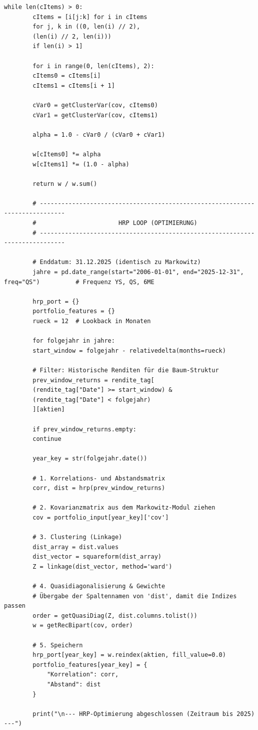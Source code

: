 \documentclass[parskip=half]{scrartcl}
\begin{document}
\begin{lstlisting}[caption={HRP-Algorithmus}, label={lst:hrp_code}]
		while len(cItems) > 0: 
		cItems = [i[j:k] for i in cItems  
		for j, k in ((0, len(i) // 2),  
		(len(i) // 2, len(i)))  
		if len(i) > 1] 
		
		for i in range(0, len(cItems), 2): 
		cItems0 = cItems[i] 
		cItems1 = cItems[i + 1] 
		
		cVar0 = getClusterVar(cov, cItems0) 
		cVar1 = getClusterVar(cov, cItems1) 
		
		alpha = 1.0 - cVar0 / (cVar0 + cVar1) 
		
		w[cItems0] *= alpha 
		w[cItems1] *= (1.0 - alpha) 
		
		return w / w.sum() 
		
		# ----------------------------------------------------------------------------- 
		#                       HRP LOOP (OPTIMIERUNG)
		# ----------------------------------------------------------------------------- 
		
		# Enddatum: 31.12.2025 (identisch zu Markowitz)
		jahre = pd.date_range(start="2006-01-01", end="2025-12-31", freq="QS")          # Frequenz YS, QS, 6ME
		
		hrp_port = {} 
		portfolio_features = {} 
		rueck = 12  # Lookback in Monaten
		
		for folgejahr in jahre: 
		start_window = folgejahr - relativedelta(months=rueck) 
		
		# Filter: Historische Renditen für die Baum-Struktur
		prev_window_returns = rendite_tag[ 
		(rendite_tag["Date"] >= start_window) & 
		(rendite_tag["Date"] < folgejahr) 
		][aktien] 
		
		if prev_window_returns.empty: 
		continue 
		
		year_key = str(folgejahr.date()) 
		
		# 1. Korrelations- und Abstandsmatrix
		corr, dist = hrp(prev_window_returns) 
		
		# 2. Kovarianzmatrix aus dem Markowitz-Modul ziehen
		cov = portfolio_input[year_key]['cov'] 
		
		# 3. Clustering (Linkage) 
		dist_array = dist.values 
		dist_vector = squareform(dist_array) 
		Z = linkage(dist_vector, method='ward') 
		
		# 4. Quasidiagonalisierung & Gewichte
		# Übergabe der Spaltennamen von 'dist', damit die Indizes passen
		order = getQuasiDiag(Z, dist.columns.tolist()) 
		w = getRecBipart(cov, order) 
		
		# 5. Speichern
		hrp_port[year_key] = w.reindex(aktien, fill_value=0.0) 
		portfolio_features[year_key] = { 
			"Korrelation": corr, 
			"Abstand": dist 
		} 
		
		print("\n--- HRP-Optimierung abgeschlossen (Zeitraum bis 2025) ---")
		
	\end{lstlisting}
	
\end{document}
